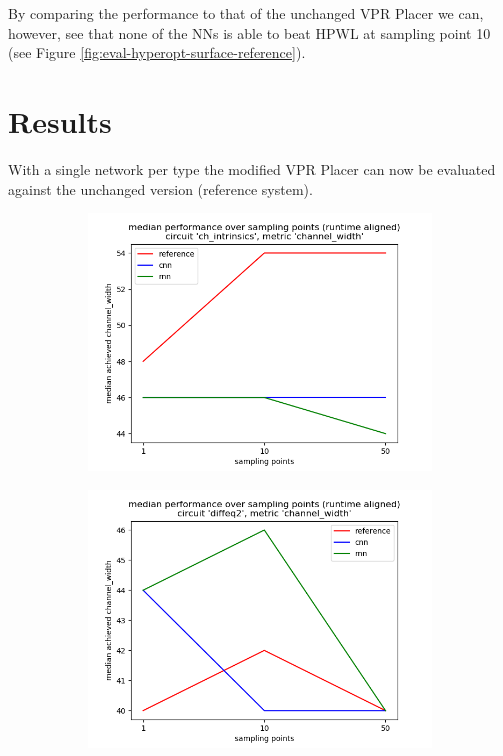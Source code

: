 By comparing the performance to that of the unchanged \gls{VPR} Placer we can, however, see that none of the \glspl{NN} is able to beat \gls{HPWL} at sampling point 10 (see Figure \ref{fig:eval-hyperopt-surface-reference}).

\section{Results}

With a single network per type the modified \gls{VPR} Placer can now be evaluated against the unchanged version (reference system).

\begin{figure}
	\centering
	\begin{subfigure}[b]{0.45\linewidth}
		\includegraphics[width=\linewidth]{plots/eval-ch_intrinsics-chan-width-median.png}
	\end{subfigure}
	\begin{subfigure}[b]{0.45\linewidth}
		\includegraphics[width=\linewidth]{plots/eval-diffeq2-chan-width-median.png}

\end{subfigure}
\end{figure}
